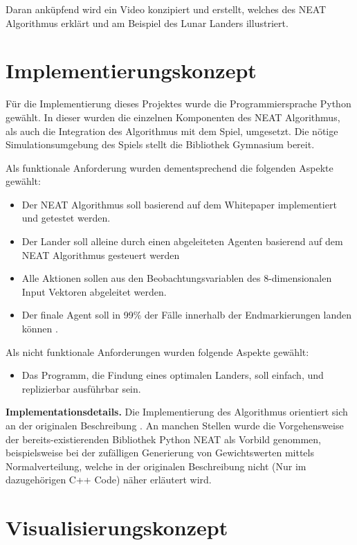 Daran anküpfend wird ein Video konzipiert und erstellt, welches des NEAT Algorithmus erklärt und am Beispiel des Lunar Landers illustriert.

\section{Implementierungskonzept}
Für die Implementierung dieses Projektes wurde die Programmiersprache Python gewählt. In dieser wurden die einzelnen Komponenten des NEAT Algorithmus, als auch die Integration des Algorithmus mit dem Spiel,  umgesetzt. Die nötige Simulationsumgebung des Spiels stellt die Bibliothek Gymnasium \cite{gymnasiumbib} bereit.

Als funktionale Anforderung wurden dementsprechend die folgenden Aspekte gewählt:
\begin{itemize}
	\item Der NEAT Algorithmus soll basierend auf dem Whitepaper implementiert und getestet werden.
	\item Der Lander soll alleine durch einen abgeleiteten Agenten basierend auf dem NEAT Algorithmus gesteuert werden
	\item Alle Aktionen sollen aus den Beobachtungsvariablen des 8-dimensionalen Input Vektoren abgeleitet werden.
	\item Der finale Agent soll in 99\% der Fälle innerhalb der Endmarkierungen landen können .
\end{itemize}

Als nicht funktionale Anforderungen wurden folgende Aspekte gewählt:
\begin{itemize}
	\item Das Programm, die Findung eines optimalen Landers, soll einfach, und replizierbar ausführbar sein.
\end{itemize}

\textbf{Implementationsdetails.} Die Implementierung des Algorithmus orientiert sich an der originalen Beschreibung \cite{NEAT}. An manchen Stellen wurde die Vorgehensweise der bereits-existierenden Bibliothek Python NEAT \cite{pythonneat} als Vorbild genommen, beispielsweise bei der zufälligen Generierung von Gewichtswerten mittels Normalverteilung, welche in der originalen Beschreibung nicht (Nur im dazugehörigen C++ Code) näher erläutert wird. 


\section{Visualisierungskonzept}

